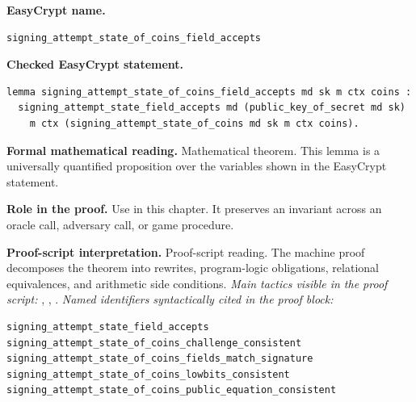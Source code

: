 \begin{formaltheorem}
\noindent\textbf{EasyCrypt name.}
\begin{lstlisting}[language=EasyCrypt,basicstyle=\ttfamily\scriptsize]
signing_attempt_state_of_coins_field_accepts
\end{lstlisting}
\noindent\textbf{Checked EasyCrypt statement.}
\begin{lstlisting}[language=EasyCrypt,basicstyle=\ttfamily\scriptsize]
lemma signing_attempt_state_of_coins_field_accepts md sk m ctx coins :
  signing_attempt_state_field_accepts md (public_key_of_secret md sk)
    m ctx (signing_attempt_state_of_coins md sk m ctx coins).
\end{lstlisting}
\noindent\textbf{Formal mathematical reading.}
Mathematical theorem. This lemma is a universally quantified proposition over the variables shown in the EasyCrypt statement.

\noindent\textbf{Role in the proof.}
Use in this chapter. It preserves an invariant across an oracle call, adversary call, or game procedure.

\noindent\textbf{Proof-script interpretation.}
Proof-script reading. The machine proof decomposes the theorem into rewrites, program-logic obligations, relational equivalences, and arithmetic side conditions.
\emph{Main tactics visible in the proof script:} , , .
\emph{Named identifiers syntactically cited in the proof block:}
\begin{lstlisting}[language=EasyCrypt,basicstyle=\ttfamily\scriptsize]
signing_attempt_state_field_accepts
signing_attempt_state_of_coins_challenge_consistent
signing_attempt_state_of_coins_fields_match_signature
signing_attempt_state_of_coins_lowbits_consistent
signing_attempt_state_of_coins_public_equation_consistent
\end{lstlisting}

\end{formaltheorem}

